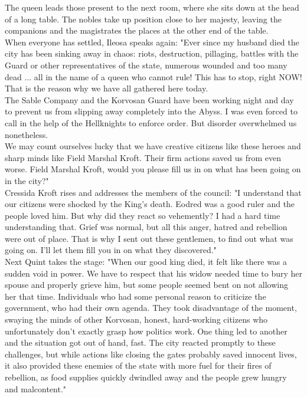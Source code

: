 The queen leads those present to the next room, where she sits down at the head of a long table. The nobles take up position close to her majesty, leaving the companions and the magistrates the places at the other end of the table.\\

When everyone has settled, Ileosa speaks again: "Ever since my husband died the city has been sinking away in chaos: riots, destruction, pillaging, battles with the Guard or other representatives of the state, numerous wounded and too many dead ... all in the name of a queen who cannot rule! This has to stop, right NOW! That is the reason why we have all gathered here today.\\

The Sable Company and the Korvosan Guard have been working night and day to prevent us from slipping away completely into the Abyss. I was even forced to call in the help of the Hellknights to enforce order. But disorder overwhelmed us nonetheless.\\

We may count ourselves lucky that we have creative citizens like these heroes and sharp minds like Field Marshal Kroft. Their firm actions saved us from even worse. Field Marshal Kroft, would you please fill us in on what has been going on in the city?"\\

Cressida Kroft rises and addresses the members of the council: "I understand that our citizens were shocked by the King's death. Eodred was a good ruler and the people loved him. But why did they react so vehemently? I had a hard time understanding that. Grief was normal, but all this anger, hatred and rebellion were out of place. That is why I sent out these gentlemen, to find out what was going on. I'll let them fill you in on what they discovered."\\

Next Quint takes the stage: "When our good king died, it felt like there was a sudden void in power. We have to respect that his widow needed time to bury her spouse and properly grieve him, but some people seemed bent on not allowing her that time. Individuals who had some personal reason to criticize the government, who had their own agenda. They took disadvantage of the moment, swaying the minds of other Korvosan, honest, hard-working citizens who unfortunately don't exactly grasp how politics work. One thing led to another and the situation got out of hand, fast. The city reacted promptly to these challenges, but while actions like closing the gates probably saved innocent lives, it also provided these enemies of the state with more fuel for their fires of rebellion, as food supplies quickly dwindled away and the people grew hungry and malcontent."\\

